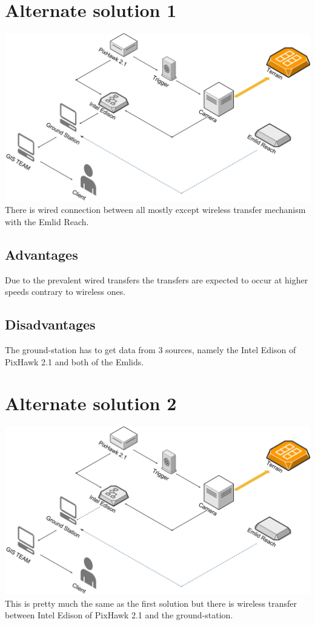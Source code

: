 \documentclass[12pt]{report}
\begin{document}
\section{Alternate solution 1}
 \includegraphics[width=\linewidth]{Alternative_Solution1.jpg}
\\
There is wired connection between all mostly except wireless transfer mechanism with the Emlid Reach.
\subsection{Advantages}
Due to the prevalent wired transfers the transfers are expected to occur at higher speeds contrary to wireless ones.
\subsection{Disadvantages} 
The ground-station has to get data from 3 sources, namely the Intel Edison of PixHawk 2.1 and both of the Emlids.
\section{Alternate solution 2}
 \includegraphics[width=\linewidth]{Alternative_Solution2.jpg}
 \\ 
 This is pretty much the same as the first solution but there is wireless transfer between Intel Edison of PixHawk 2.1 and the ground-station.
\end{document}

